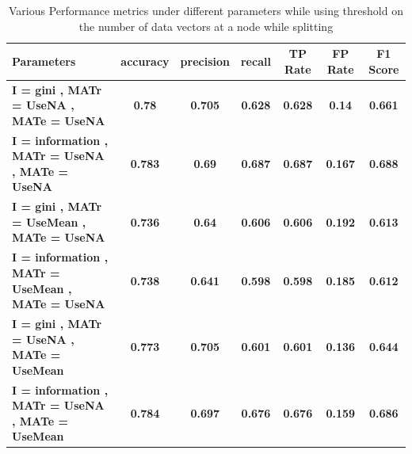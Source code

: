 \documentclass[12pt]{article}%
\begin{document}
\begin{center}
\begin{table}
\centering
\label{table:prune}
\caption{Various Performance metrics under different parameters while using threshold on the number of data vectors at a node while splitting}
\begin{tabular}{|p{2in}|c|c|c|c|c|c|}
 \hline
 {\bf Parameters } & {\bf accuracy } & {\bf precision } & {\bf recall } & {\bf TP Rate } & {\bf FP Rate } & {\bf F1 Score } \\ \hline
 {\bf I = gini , MATr = UseNA , MATe = UseNA  } & {\bf 0.78 } & {\bf 0.705 } & {\bf 0.628 } & {\bf 0.628 } & {\bf 0.14 } & {\bf 0.661 } \\ \hline
 {\bf I = information , MATr = UseNA , MATe = UseNA  } & {\bf 0.783 } & {\bf 0.69 } & {\bf 0.687 } & {\bf 0.687 } & {\bf 0.167 } & {\bf 0.688 } \\ \hline
 {\bf I = gini , MATr = UseMean , MATe = UseNA  } & {\bf 0.736 } & {\bf 0.64 } & {\bf 0.606 } & {\bf 0.606 } & {\bf 0.192 } & {\bf 0.613 } \\ \hline
 {\bf I = information , MATr = UseMean , MATe = UseNA  } & {\bf 0.738 } & {\bf 0.641 } & {\bf 0.598 } & {\bf 0.598 } & {\bf 0.185 } & {\bf 0.612 } \\ \hline
 {\bf I = gini , MATr = UseNA , MATe = UseMean  } & {\bf 0.773 } & {\bf 0.705 } & {\bf 0.601 } & {\bf 0.601 } & {\bf 0.136 } & {\bf 0.644 } \\ \hline
 {\bf I = information , MATr = UseNA , MATe = UseMean  } & {\bf 0.784 } & {\bf 0.697 } & {\bf 0.676 } & {\bf 0.676 } & {\bf 0.159 } & {\bf 0.686 } \\ \hline
\end{tabular}
\end{table}
\end{center}
\end{document}
